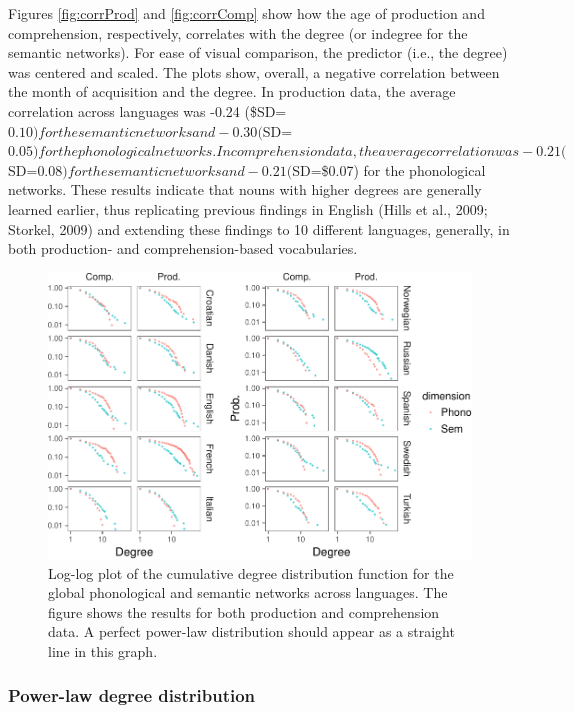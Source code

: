 \documentclass[english,floatsintext,man]{apa6}
\theoremstyle{definition}
\theoremstyle{definition}
\theoremstyle{definition}
\theoremstyle{remark}
\begin{document}
Figures \ref{fig:corrProd} and \ref{fig:corrComp} show how the age of
production and comprehension, respectively, correlates with the degree
(or indegree for the semantic networks). For ease of visual comparison,
the predictor (i.e., the degree) was centered and scaled. The plots
show, overall, a negative correlation between the month of acquisition
and the degree. In production data, the average correlation across
languages was -0.24
(\$SD=\(0.10) for the semantic networks and -0.30 (\)SD=\(0.05) for the phonological networks. In comprehension data, the average correlation was -0.21 (\)SD=\(0.08) for the semantic networks and -0.21 (\)SD=\$0.07)
for the phonological networks. These results indicate that nouns with
higher degrees are generally learned earlier, thus replicating previous
findings in English (Hills et al., 2009; Storkel, 2009) and extending
these findings to 10 different languages, generally, in both production-
and comprehension-based vocabularies.

\begin{figure}[!h]
\includegraphics[width=\textwidth]{ms_files/figure-latex/degreeDist-1} \caption{Log-log plot of the cumulative degree distribution function for the global phonological and semantic networks across languages. The figure shows the results for both production and comprehension data. A perfect power-law distribution should appear as a straight line in this graph.}\label{fig:degreeDist}
\end{figure}

\subsubsection{Power-law degree
distribution}\label{power-law-degree-distribution}
\end{document}
